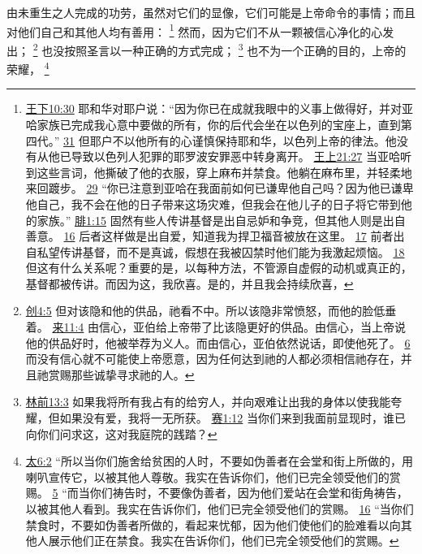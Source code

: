 \documentclass[12pt, a4paper, oneside]{ctexart}
\newcounter{parnum}[section]
\newcommand{\N}{%
   \noindent\refstepcounter{parnum}%
    \makebox[\parindent][l]{\textbf{\arabic{parnum}.}}}
\begin{document}
\N 由未重生之人完成的功劳，虽然对它们的显像，它们可能是上帝命令的事情；而且对他们自己和其他人均有善用：
	\footnote {
		\href{https://biblehub.com/2_kings/10-30.htm}{王下10:30} 耶和华对耶户说：“因为你已在成就我眼中的义事上做得好，并对亚哈家族已完成我心意中要做的所有，你的后代会坐在以色列的宝座上，直到第四代。”
		\href{https://biblehub.com/2_kings/10-31.htm}{31} 但耶户不以他所有的心谨慎保持耶和华，以色列上帝的律法。他没有从他已导致以色列人犯罪的耶罗波安罪恶中转身离开。
		\href{https://biblehub.com/1_kings/21-27.htm}{王上21:27} 当亚哈听到这些言词，他撕破了他的衣服，穿上麻布并禁食。他躺在麻布里，并轻柔地来回踱步。
		\href{https://biblehub.com/1_kings/21-29.htm}{29} “你已注意到亚哈在我面前如何已谦卑他自己吗？因为他已谦卑他自己，我不会在他的日子带来这场灾难，但我会在他儿子的日子将它带到他的家族。”
		\href{https://biblehub.com/philippians/1-15.htm}{腓1:15} 固然有些人传讲基督是出自忌妒和争竞，但其他人则是出自善意。
		\href{https://biblehub.com/philippians/1-16.htm}{16} 后者这样做是出自爱，知道我为捍卫福音被放在这里。
		\href{https://biblehub.com/philippians/1-17.htm}{17} 前者出自私望传讲基督，而不是真诚，假想在我被囚禁时他们能为我激起烦恼。
		\href{https://biblehub.com/philippians/1-18.htm}{18} 但这有什么关系呢？重要的是，以每种方法，不管源自虚假的动机或真正的，基督都被传讲。而因为这，我欣喜。是的，并且我会持续欣喜，
	}
	然而，因为它们不从一颗被信心净化的心发出；
	\footnote {
		\href{https://biblehub.com/genesis/4-5.htm}{创4:5} 但对该隐和他的供品，祂看不中。所以该隐非常愤怒，而他的脸低垂着。
		\href{https://biblehub.com/hebrews/11-4.htm}{来11:4} 由信心，亚伯给上帝带了比该隐更好的供品。由信心，当上帝说他的供品好时，他被举荐为义人。而由信心，亚伯依然说话，即使他死了。
		\href{https://biblehub.com/hebrews/11-6.htm}{6} 而没有信心就不可能使上帝愿意，因为任何达到祂的人都必须相信祂存在，并且祂赏赐那些诚挚寻求祂的人。
	}
	也没按照圣言以一种正确的方式完成；
	\footnote {
		\href{https://biblehub.com/1_corinthians/13-3.htm}{林前13:3} 如果我将所有我占有的给穷人，并向艰难让出我的身体以使我能夸耀，但如果没有爱，我将一无所获。
		\href{https://biblehub.com/isaiah/1-12.htm}{赛1:12} 当你们来到我面前显现时，谁已向你们问求这，这对我庭院的践踏？
	}
	也不为一个正确的目的，上帝的荣耀，
	\footnote {
		\href{https://biblehub.com/matthew/6-2.htm}{太6:2} “所以当你们施舍给贫困的人时，不要如伪善者在会堂和街上所做的，用喇叭宣传它，以被其他人尊敬。我实在告诉你们，他们已完全领受他们的赏赐。
		\href{https://biblehub.com/matthew/6-5.htm}{5} “而当你们祷告时，不要像伪善者，因为他们爱站在会堂和街角祷告，以被其他人看到。我实在告诉你们，他们已完全领受他们的赏赐。
		\href{https://biblehub.com/matthew/6-16.htm}{16} “当你们禁食时，不要如伪善者所做的，看起来忧郁，因为他们使他们的脸难看以向其他人展示他们正在禁食。我实在告诉你们，他们已完全领受他们的赏赐。
	}
\end{document}
